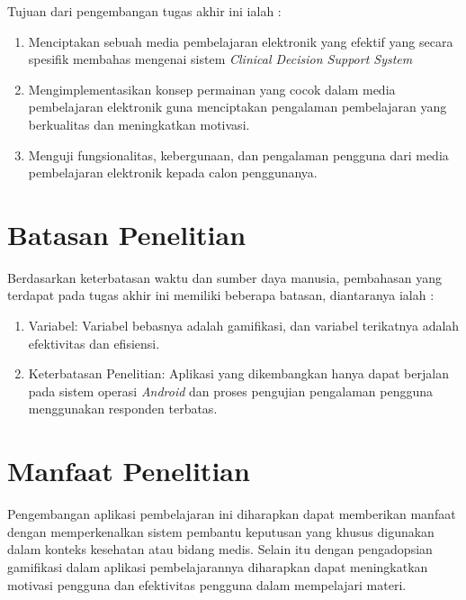 Tujuan dari pengembangan tugas akhir ini ialah :
\begin{enumerate}
	\item Menciptakan sebuah media pembelajaran elektronik yang efektif yang secara spesifik membahas mengenai sistem \textit{Clinical Decision Support System}
	\item Mengimplementasikan konsep permainan yang cocok dalam media pembelajaran elektronik guna menciptakan pengalaman pembelajaran yang berkualitas dan meningkatkan motivasi.
	\item Menguji fungsionalitas, kebergunaan, dan pengalaman pengguna dari media pembelajaran elektronik kepada calon penggunanya.
\end{enumerate}

\section{Batasan Penelitian}
Berdasarkan keterbatasan waktu dan sumber daya manusia, pembahasan yang terdapat pada tugas akhir ini memiliki beberapa batasan, diantaranya ialah :
\begin{enumerate}
\item Variabel: Variabel bebasnya adalah gamifikasi, dan variabel terikatnya adalah efektivitas dan efisiensi.
\item Keterbatasan Penelitian: Aplikasi yang dikembangkan hanya dapat berjalan pada sistem operasi \textit{Android} dan proses pengujian pengalaman pengguna menggunakan responden terbatas.
\end{enumerate}

\section{Manfaat Penelitian}
Pengembangan aplikasi pembelajaran ini diharapkan dapat memberikan manfaat dengan memperkenalkan sistem pembantu keputusan yang khusus digunakan dalam konteks kesehatan atau bidang medis.
Selain itu dengan pengadopsian gamifikasi dalam aplikasi pembelajarannya diharapkan dapat meningkatkan motivasi pengguna dan efektivitas pengguna dalam mempelajari materi.

